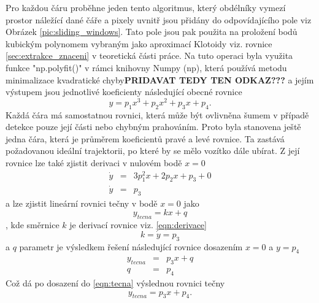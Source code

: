 \documentclass[czech, bc, kky, he, iso690numb]{fasthesis}
\begin{document}
            	Pro každou čáru proběhne jeden tento algoritmus, který obdélníky vymezí prostor náležící dané čáře a pixely uvnitř jsou přidány do odpovídajícího pole viz Obrázek \ref{pic:sliding_windows}. Tato pole jsou pak použita na proložení bodů kubickým polynomem vybraným jako aproximací Klotoidy viz. rovnice \ref{sec:extrakce_znaceni} v teoretická části práce. Na tuto operaci byla využita funkce \command"np.polyfit()" v rámci knihovny Numpy (np), která používá metodu minimalizace kvadratické chyby\textbf{PRIDAVAT TEDY TEN ODKAZ???} a jejím výstupem jsou jednotlivé koeficienty následující obecné rovnice
            		\begin{equation}
            			y = p_{1}x^{3} + p_{2}x^{2} + p_{3}x + p_{4}.
            		\end{equation}
            	Každá čára má samostatnou rovnici, která může být ovlivněna šumem v případě detekce pouze její části nebo chybným prahováním. Proto byla stanovena ještě jedna čára, která je průměrem koeficientů pravé a levé rovnice. Ta zastává požadovanou ideální trajektorii, po které by se mělo vozítko dále ubírat. Z její rovnice lze také zjistit derivaci v nulovém bodě \(x=0\)
            		\begin{eqnarray}
            			\dot{y} &=& 3p_{1}^{2}x + 2p_{2}x + p_{3} + 0\\
            			\dot{y} &=& p_{3} \label{eqn:derivace}
            		\end{eqnarray}
            	a lze zjistit lineární rovnici tečny v bodě \(x=0\) jako
            		\begin{equation}
            			y_{tecna} = kx + q \label{eqn:tecna}	
            		\end{equation},
            	kde  směrnice \(k\) je derivací rovnice viz. \ref{eqn:derivace}
            		\begin{equation}
            			k = \dot{y} = p_{3}
            		\end{equation}
            	a \(q\) parametr je výsledkem řešení následující rovnice dosazením \(x=0\) a \(y=p_{4}\)
            		\begin{eqnarray}
            			y_{tecna} &=& p_{3}x + q\\
            			q &=& p_{4}
            		\end{eqnarray}
            	Což dá po dosazení do \ref{eqn:tecna} výslednou rovnici tečny
            		\begin{equation}
            			y_{tecna} = p_{3}x + p_{4}.
            		\end{equation}
            	
\end{document}
